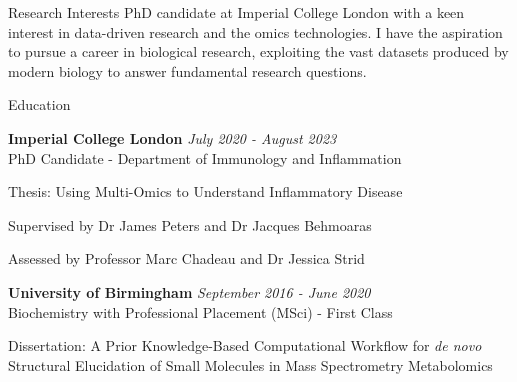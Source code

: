 \documentclass{resume}
\begin{document}
\begin{rSection}{Research Interests}
PhD candidate at Imperial College London with a keen interest in data-driven research and the omics technologies. I have the aspiration to pursue a career in biological research, exploiting the vast datasets produced by modern biology to answer fundamental research questions.

\end{rSection}
\begin{rSection}{Education}

\smallskip
{\bf Imperial College London} \hfill {\em July 2020 - August 2023} 
\\ PhD Candidate - Department of Immunology and Inflammation

\smallskip
\item Thesis: Using Multi-Omics to Understand Inflammatory Disease
\item Supervised by Dr James Peters and Dr Jacques Behmoaras 
\item Assessed by Professor Marc Chadeau and Dr Jessica Strid

\medskip

{\bf University of Birmingham} \hfill {\em September 2016 - June 2020} 
\\ Biochemistry with Professional Placement (MSci) - First Class

\smallskip
\item Dissertation: A Prior Knowledge-Based Computational Workflow for \textit{de novo} Structural Elucidation of Small Molecules in Mass Spectrometry Metabolomics

\end{rSection}

\end{document}
